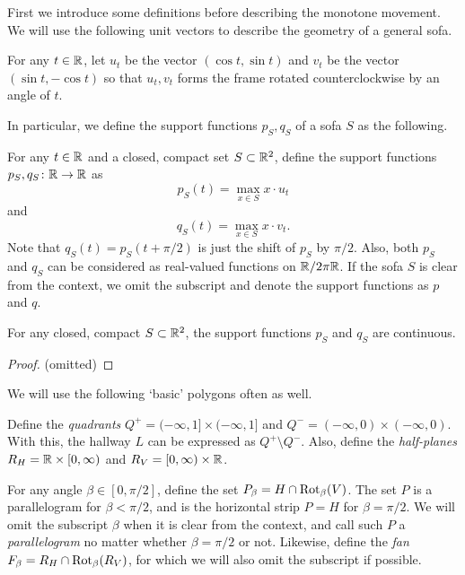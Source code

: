 First we introduce some definitions before describing the monotone movement.
We will use the following unit vectors to describe the geometry of a general sofa.
\begin{definition}
For any $t \in \mathbb{R}$, let $u_t$ be the vector $(\cos t, \sin t)$ and $v_t$ be the vector $(\sin t, -\cos t)$ so that $u_t, v_t$ forms the frame rotated counterclockwise by an angle of $t$.
\end{definition}
In particular, we define the support functions $p_S, q_S$ of a sofa $S$ as the following.
\begin{definition}
\label{def:support}
For any $t \in \mathbb{R}$ and a closed, compact set $S \subset \mathbb{R}^2$, define the support functions $p_S, q_S \colon \mathbb{R} \rightarrow \mathbb{R}$ as
$$p_S(t) = \max_{x \in S} x \cdot u_t$$
and
$$q_S(t) = \max_{x \in S} x \cdot v_t.$$
Note that $q_S(t) = p_S(t + \pi / 2)$ is just the shift of $p_S$ by $\pi / 2$.
Also, both $p_S$ and $q_S$ can be considered as real-valued functions on $\mathbb{R} / 2 \pi \mathbb{R}$.
If the sofa $S$ is clear from the context, we omit the subscript and denote the support functions as $p$ and $q$.
\end{definition}
\begin{theorem}
\label{thm:support-continuous}
For any closed, compact $S \subset \mathbb{R}^2$, the support functions $p_S$ and $q_S$ are continuous.
\end{theorem}
\begin{proof}
(omitted)
\end{proof}

We will use the following `basic' polygons often as well. 
\begin{definition}
\label{def:polygons}
Define the \emph{quadrants} $Q^+ = (-\infty, 1] \times (-\infty, 1]$ and $Q^- = (-\infty, 0) \times (-\infty, 0)$.
With this, the hallway $L$ can be expressed as $Q^+ \setminus Q^-$.
Also, define the \emph{half-planes} $R_H = \mathbb{R} \times [0, \infty)$ and $R_V = [0, \infty) \times \mathbb{R}$.

For any angle $\beta \in [0, \pi / 2]$, define the set $P_\beta = H \cap \operatorname{Rot}_\beta(V)$. The set $P$ is a parallelogram for $\beta < \pi / 2$, and is the horizontal strip $P = H$ for $\beta = \pi / 2$.
We will omit the subscript $\beta$ when it is clear from the context, and call such $P$ a \emph{parallelogram} no matter whether $\beta = \pi / 2$ or not.
Likewise, define the \emph{fan} $F_\beta = R_H \cap \operatorname{Rot}_\beta(R_V)$, for which we will also omit the subscript if possible.
\end{definition}

